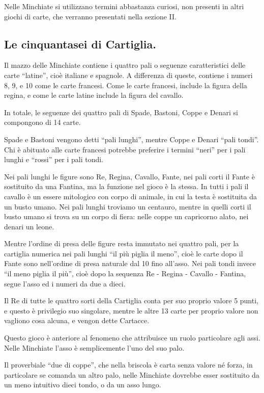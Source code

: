 \documentclass[11pt,a6paper]{article}
\begin{document}
Nelle Minchiate si utilizzano termini abbastanza curiosi, non presenti in
altri giochi di carte, che verranno presentati nella sezione II.

\subsection{Le cinquantasei di Cartiglia.}

Il mazzo delle Minchiate contiene i quattro pali o seguenze caratteristici
delle carte ``latine'', cioè italiane e spagnole. A differenza di queste,
contiene i numeri 8, 9, e 10 come le carte francesi. Come le carte francesi,
include la figura della regina, e come le carte latine include la figura del
cavallo.

In totale, le seguenze dei quattro pali di Spade, Bastoni, Coppe e Denari si
compongono di 14 carte.

Spade e Bastoni vengono detti ``pali lunghi'', mentre Coppe e Denari ``pali
tondi''. Chi è abituato alle carte francesi potrebbe preferire i termini
``neri'' per i pali lunghi e ``rossi'' per i pali tondi.

Nei pali lunghi le figure sono Re, Regina, Cavallo, Fante, nei pali corti il
Fante è sostituito da una Fantina, ma la funzione nel gioco è la stessa. In
tutti i pali il cavallo è un essere mitologico con corpo di animale, in cui
la testa è sostituita da un busto umano.  Nei pali lunghi troviamo un
centauro, mentre in quelli corti il busto umano si trova su un corpo di
fiera: nelle coppe un capricorno alato, nei denari un leone.

Mentre l'ordine di presa delle figure resta immutato nei quattro pali, per
la cartiglia numerica nei pali lunghi ``il più piglia il meno'', cioè le
carte dopo il Fante sono nell'ordine di presa naturale dal 10 fino
all'asso. Nei pali tondi invece ``il meno piglia il più'', cioè dopo la
sequenza Re - Regina - Cavallo - Fantina, segue l'asso ed i numeri da due a
dieci.

Il Re di tutte le quattro sorti della Cartiglia conta per suo proprio valore
5 punti, e questo è privilegio suo singolare, mentre le altre 13 carte per
proprio valore non vagliono cosa alcuna, e vengon dette Cartacce.

Questo gioco è anteriore al fenomeno che attribuisce un ruolo particolare
agli assi. Nelle Minchiate l'asso è semplicemente l'uno del suo palo.

Il proverbiale ``due di coppe'', che nella briscola è carta senza valore né
forza, in particolare se comanda un altro palo, nelle Minchiate dovrebbe
esser sostituito da un meno intuitivo dieci tondo, o da un asso lungo.
\end{document}
